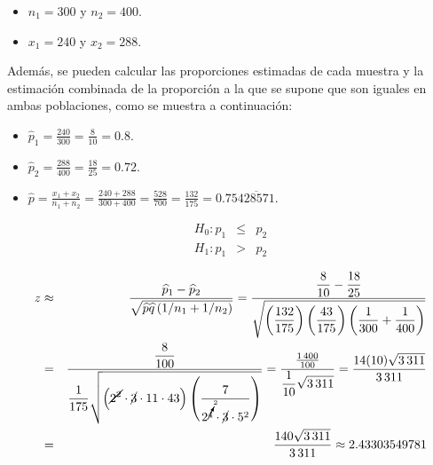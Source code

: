 \begin{solucion}
 \begin{datos}
  $\phantom{0}$
  \begin{itemize}
   \item $n_1 = 300$ y $n_2 = 400$.
   \item $x_1 = 240$ y $x_2 = 288$.
  \end{itemize}
  Adem\'as, se pueden calcular las proporciones estimadas de cada muestra
  y la estimaci\'on combinada de la proporci\'on a la que se supone que son iguales
  en ambas poblaciones, como se muestra a continuaci\'on:
  \begin{itemize}
   \item $\widehat{p}_1 = \frac{240}{300} = \frac{8}{10} = 0.8$.
   \item $\widehat{p}_2 = \frac{288}{400} = \frac{18}{25} = 0.72$.
   \item $\widehat{p} = \frac{x_1+x_2}{n_1+n_2} = \frac{240+288}{300+400}
   = \frac{528}{700} = \frac{132}{175} = 0.75\overline{428571}$.
  \end{itemize}
 \end{datos}

 \begin{hipotesis}
  \begin{eqnarray*}
   H_0: p_1 & \leq & p_2 \\
   H_1: p_1 &  >   & p_2
  \end{eqnarray*}
 \end{hipotesis}

 \begin{estadistico}
  \begin{eqnarray*}
   z & \approx &
   \frac{\widehat{p}_1 - 
   \widehat{p}_2}{\sqrt{\widehat{p}\widehat{q}\left(1/n_1+1/n_2\right)}}
   = \frac{
   \displaystyle{ \frac{8}{10} - \frac{18}{25}}
   }{
   \displaystyle{ \sqrt{
   \left(\frac{132}{175}\right)\left(\frac{43}{175}\right)
   \left(\frac{1}{300} + \frac{1}{400}\right)
   }}} \\
   & = & \frac{
   \displaystyle{ \frac{8}{100}}
   }{\displaystyle{
   \frac{1}{175}\sqrt{ \left( \cancel{2^2}\cdot\cancel{3}\cdot 11\cdot 43 \right)
   \left( \frac{7}{2^{\cancelto{2}{4}} \cdot \cancel{3} \cdot 5^2} \right) } 
   }}
   = \frac{\frac{1\,400}{100}}{\displaystyle{\frac{1}{10}\sqrt{3\,311}}}
   = \frac{14(10)\sqrt{3\,311}}{3\,311} \\
   & = & \frac{140\sqrt{3\,311}}{3\,311} \approx 2.43303549781
  \end{eqnarray*}
 \end{estadistico}


\end{solucion}
